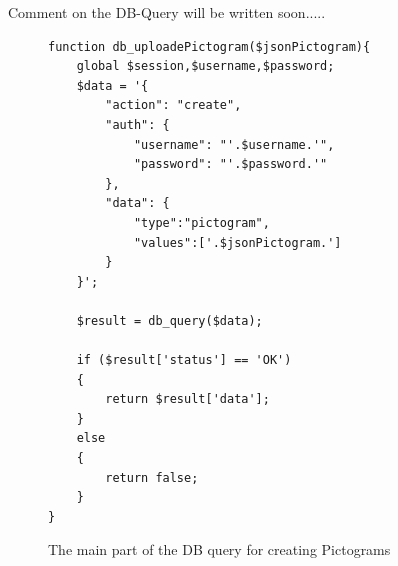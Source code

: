 Comment on the DB-Query will be written soon.....

\lstset{language=PHP}
\begin{figure}[htbp]
\begin{lstlisting}[firstline=1]
function db_uploadePictogram($jsonPictogram){
	global $session,$username,$password;
	$data = '{
		"action": "create",
		"auth": {
			"username": "'.$username.'",
			"password": "'.$password.'"
		},
	    "data": {
	    	"type":"pictogram",
	    	"values":['.$jsonPictogram.']
	    }
	}';
	
	$result = db_query($data);

	if ($result['status'] == 'OK')
	{
		return $result['data'];
	}
	else
	{
		return false;
	}
}
\end{lstlisting}
\caption{The main part of the DB query for creating Pictograms}
\label{lst:picsManagerMakeDbQuery}
\end{figure}